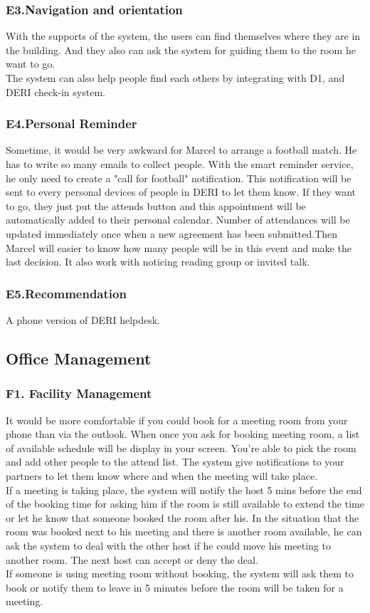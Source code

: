 \documentclass[a4paper]{llncs}
\begin{document}
\subsubsection{E3.Navigation and orientation}
With the supports of the system, the users can find themselves where they are in the building. And they also can ask the system for guiding them to the room he want to go.\\
The system can also help people find each others by integrating with D1, and DERI check-in system.
\subsubsection{E4.Personal Reminder}
Sometime, it would be very awkward for Marcel to arrange a football match. He has to write so many emails to collect people. With the smart reminder service, he only need to create a "call for football" notification. This notification will be sent to every personal devices of people in DERI to let them know. If they want to go, they just put the attends button and this appointment will be automatically added to their personal calendar. Number of attendances will be updated immediately once when a new agreement has been submitted.Then Marcel will easier to know how many people will be in this event and make the last decision. It also work with noticing reading group or invited talk.
\subsubsection{E5.Recommendation}
A phone version of DERI helpdesk. 
\subsection{Office Management}
\subsubsection{F1. Facility Management}
It would be more comfortable if you could book for a meeting room from your phone than via the outlook. When once you ask for booking meeting room, a list of available schedule will be display in your screen. You're able to pick the room and add other people to the attend list. The system give notifications to your partners to let them know where and when the meeting will take place.\\
If a meeting is taking place, the system will notify the host 5 mins before the end of the booking time for asking him if the room is still available to extend the time or let he know that someone booked the room after his. In the situation that the room was booked next to his meeting and there is another room available, he can ask the system to deal with the other host if he could move his meeting to another room. The next host can accept or deny the deal.\\
If someone is using meeting room without booking, the system will ask them to book or notify them to leave in 5 minutes before the room will be taken for a meeting.
\end{document}
